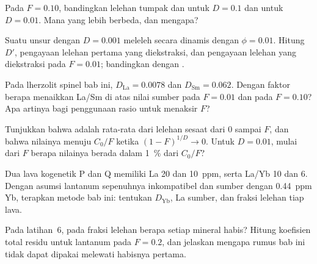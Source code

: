 \begin{exercise}[$\star\star$]\label{exo:b3:trace-element-modelling:7}
Pada $F = 0.10$, bandingkan lelehan tumpak dan  untuk
$D = 0.1$ dan untuk $D = 0.01$. Mana yang lebih berbeda, dan mengapa?
\end{exercise}

\begin{exercise}[$\star\star$]\label{exo:b3:trace-element-modelling:8}
Suatu unsur dengan $D = 0.001$ meleleh secara dinamis dengan $\phi = 0.01$. Hitung
$D'$, pengayaan lelehan pertama yang diekstraksi, dan pengayaan lelehan yang
diekstraksi pada $F = 0.01$; bandingkan dengan .
\end{exercise}

\begin{exercise}[$\star\star$]\label{exo:b3:trace-element-modelling:9}
Pada lherzolit spinel bab ini, $D_{\mathrm{La}} = 0.0078$ dan
$D_{\mathrm{Sm}} = 0.062$. Dengan faktor berapa  menaikkan La/Sm di atas
nilai sumber pada $F = 0.01$ dan pada $F = 0.10$? Apa artinya bagi penggunaan
rasio untuk menaksir $F$?
\end{exercise}

\begin{exercise}[$\star\star\star$]\label{exo:b3:trace-element-modelling:10}
Tunjukkan bahwa  adalah rata-rata dari lelehan sesaat
dari 0 sampai $F$, dan bahwa nilainya menuju $C_0/F$ ketika $(1 - F)^{1/D} \to 0$.
Untuk $D = 0.01$, mulai dari $F$ berapa nilainya berada dalam \qty{1}{\percent} dari $C_0/F$?
\end{exercise}

\begin{exercise}[$\star\star\star$]\label{exo:b3:trace-element-modelling:11}
Dua lava kogenetik P dan Q memiliki La 20 dan \qty{10}{ppm}, serta La/Yb 10 dan 6.
Dengan asumsi lantanum sepenuhnya inkompatibel dan sumber dengan
\qty{0.44}{ppm} Yb, terapkan metode bab ini: tentukan $D_{\mathrm{Yb}}$,
La sumber, dan fraksi lelehan tiap lava.
\end{exercise}

\begin{exercise}[$\star\star\star$]\label{exo:b3:trace-element-modelling:12}
Pada  latihan~6, pada fraksi lelehan berapa setiap mineral
habis? Hitung koefisien total residu untuk lantanum pada
$F = 0.2$, dan jelaskan mengapa rumus bab ini tidak dapat dipakai melewati
habisnya pertama.
\end{exercise}

